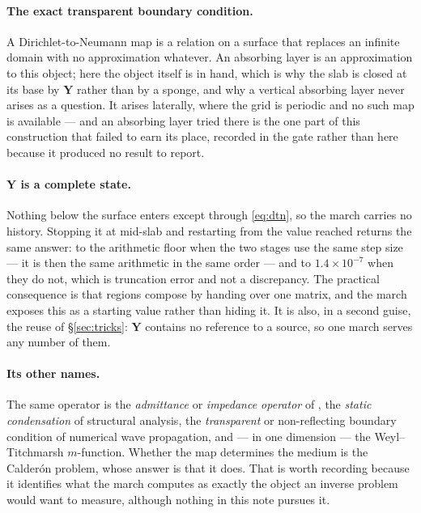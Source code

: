 \documentclass[11pt,a4paper]{article}
\newcommand{\bY}{\mathbf{Y}}
\begin{document}
\paragraph{The exact transparent boundary condition.}  A Dirichlet-to-Neumann
map is a relation on a surface that replaces an infinite domain with no
approximation whatever.  An absorbing layer is an approximation to this object;
here the object itself is in hand, which is why the slab is closed at its base
by $\bY$ rather than by a sponge, and why a vertical absorbing layer never
arises as a question.  It arises laterally, where the grid is periodic and no
such map is available --- and an absorbing layer tried there is the one part of
this construction that failed to earn its place, recorded in the gate rather
than here because it produced no result to report.

\paragraph{$\bY$ is a complete state.}  Nothing below the surface enters except
through \eqref{eq:dtn}, so the march carries no history.  Stopping it at
mid-slab and restarting from the value reached returns the same answer: to the
arithmetic floor when the two stages use the same step size --- it is then the
same arithmetic in the same order --- and to $1.4\times10^{-7}$ when they do
not, which is truncation error and not a discrepancy.  The practical consequence
is that regions compose by handing over one matrix, and the march exposes this
as a starting value rather than hiding it.  It is also, in a second guise, the
reuse of \S\ref{sec:tricks}: $\bY$ contains no reference to a source, so one
march serves any number of them.

\paragraph{Its other names.}  The same operator is the \emph{admittance} or
\emph{impedance operator} of \cite{haines1989,hainesdehoop1996,haines2004}, the
\emph{static condensation} of structural analysis, the \emph{transparent} or
non-reflecting boundary condition of numerical wave propagation, and --- in one
dimension --- the Weyl--Titchmarsh $m$-function.  Whether the map determines the
medium is the Calder\'on problem, whose answer is that it does.  That is worth
recording because it identifies what the march computes as exactly the object an
inverse problem would want to measure, although nothing in this note pursues it.
\end{document}
